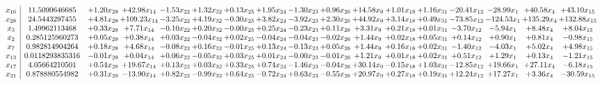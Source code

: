 \documentclass[9pt]{article}
\begin{document}
 \[\begin{array}{c| c c@{\hskip 2pt} c@{\hskip 2pt} c@{\hskip 2pt} c@{\hskip 2pt} c@{\hskip 2pt} c@{\hskip 2pt} c@{\hskip 2pt} c@{\hskip 2pt} c@{\hskip 2pt} c@{\hskip 2pt} c@{\hskip 2pt} c@{\hskip 2pt} c@{\hskip 2pt} c@{\hskip 2pt} c@{\hskip 2pt} }
 x_{16}   &  11.5090646685 & +  1.20 x_{29} & + 42.98 x_{14} & -1.53 x_{22} & +  1.32 x_{32} & +  0.13 x_{25} & +  1.95 x_{24} & -1.30 x_{23} & +  0.96 x_{26} & + 14.58 x_{9} & +  1.01 x_{18} & +  1.16 x_{31} & -20.41 x_{12} & -28.99 x_{1} & + 40.58 x_{4} & + 43.10 x_{15}\\
 x_{28}   &  24.5443297455 & +  4.81 x_{29} & + 109.23 x_{14} & -3.25 x_{22} & +  4.19 x_{32} & -0.30 x_{25} & +  3.82 x_{24} & -3.92 x_{23} & +  2.30 x_{26} & + 44.92 x_{9} & +  3.14 x_{18} & +  0.49 x_{31} & -73.85 x_{12} & -124.53 x_{1} & + 135.29 x_{4} & + 132.88 x_{15}\\
 x_{3}   &  1.49962113468 & +  0.33 x_{29} & +  7.71 x_{14} & -0.10 x_{22} & +  0.20 x_{32} & -0.00 x_{25} & +  0.25 x_{24} & -0.23 x_{23} & +  0.11 x_{26} & +  3.31 x_{9} & +  0.21 x_{18} & +  0.01 x_{31} & -3.70 x_{12} & -5.94 x_{1} & +  8.48 x_{4} & +  8.04 x_{15}\\
 x_{2}   &  0.285125960273 & +  0.05 x_{29} & +  0.38 x_{14} & +  0.03 x_{22} & -0.04 x_{32} & +  0.02 x_{25} & -0.04 x_{24} & -0.04 x_{23} & -0.02 x_{26} & +  1.44 x_{9} & +  0.02 x_{18} & +  0.05 x_{31} & +  0.14 x_{12} & +  0.90 x_{1} & +  0.81 x_{4} & -0.98 x_{15}\\
 x_{7}   &  0.982814904264 & +  0.18 x_{29} & +  4.68 x_{14} & -0.08 x_{22} & +  0.16 x_{32} & -0.01 x_{25} & +  0.13 x_{24} & -0.13 x_{23} & +  0.05 x_{26} & +  1.44 x_{9} & +  0.16 x_{18} & +  0.02 x_{31} & -1.40 x_{12} & -4.03 x_{1} & +  5.02 x_{4} & +  4.98 x_{15}\\
 x_{13}   &  0.0118293835316 & -0.01 x_{29} & +  0.04 x_{14} & +  0.06 x_{22} & -0.05 x_{32} & +  0.03 x_{25} & +  0.01 x_{24} & -0.00 x_{23} & -0.01 x_{26} & +  1.21 x_{9} & +  0.01 x_{18} & +  0.02 x_{31} & +  0.51 x_{12} & +  1.29 x_{1} & +  0.13 x_{4} & -1.21 x_{15}\\
 x_{17}   &  4.05664210501 & +  0.54 x_{29} & + 19.67 x_{14} & +  0.13 x_{22} & +  0.03 x_{32} & +  0.33 x_{25} & +  0.74 x_{24} & -1.46 x_{23} & -0.04 x_{26} & + 30.14 x_{9} & -0.15 x_{18} & +  1.03 x_{31} & -12.85 x_{12} & + 19.66 x_{1} & + 27.11 x_{4} & -6.18 x_{15}\\
 x_{21}   &  0.878880554982 & +  0.31 x_{29} & -13.90 x_{14} & +  0.82 x_{22} & -0.99 x_{32} & +  0.64 x_{25} & -0.72 x_{24} & +  0.63 x_{23} & -0.55 x_{26} & + 20.97 x_{9} & +  0.27 x_{18} & +  0.19 x_{31} & + 12.24 x_{12} & + 17.27 x_{1} & +  3.36 x_{4} & -30.59 x_{15}\\

\end{array}\]
\end{document}
